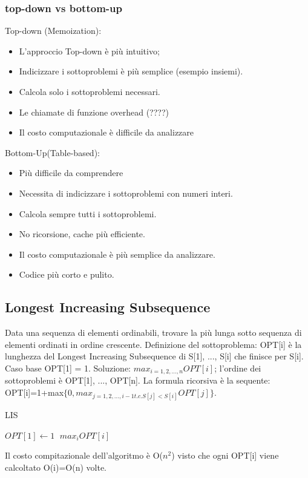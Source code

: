 \documentclass{article}
\begin{document}
\subsubsection{ top-down vs bottom-up}
Top-down (Memoization):
\begin{itemize}
    \item L'approccio Top-down è più intuitivo;
    \item Indicizzare i sottoproblemi è più semplice (esempio insiemi).
    \item Calcola solo i sottoproblemi necessari.
    \item Le chiamate di funzione overhead (????)
    \item Il costo computazionale è difficile da analizzare
\end{itemize}
Bottom-Up(Table-based):
\begin{itemize}
    \item  Più difficile da comprendere
    \item Necessita di indicizzare i sottoproblemi con numeri interi.
    \item Calcola sempre tutti i sottoproblemi.
    \item No ricorsione, cache più efficiente.
    \item Il costo computazionale è più semplice da analizzare.
    \item Codice più corto e pulito.
\end{itemize}
\subsection{Longest Increasing Subsequence}
Data una sequenza di elementi ordinabili, trovare la più lunga sotto sequenza di elementi ordinati in ordine crescente.\newline
Definizione del sottoproblema: OPT[i] è la lunghezza del Longest Increasing Subsequence di S[1], ..., S[i] che finisce per S[i].\newline
Caso base OPT[1] = 1.\newline
Soluzione: $max_{i=1,2,\dots,n}OPT[i]$; l'ordine dei sottoproblemi è OPT[1], ..., OPT[n].\newline
La formula ricorsiva è la sequente: OPT[i]=1+max$\{0,max_{j=1,2,\dots,i-1 t.c. S[j]<S[i]}OPT[j]\}$.
\begin{center}
\begin{algorithm}
\caption{LIS}
$OPT[1]\leftarrow1\;$
\Return $max_i OPT[i]$\;
\end{algorithm}
\end{center}
Il costo compitazionale dell'algoritmo è O($n^2$) visto che ogni OPT[i] viene calcoltato O(i)=O(n) volte.
\end{document}

